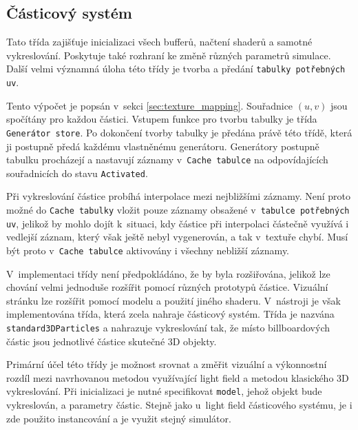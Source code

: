     
\subsection{Částicový systém}
\label{sec:impl_particles}
Tato třída zajišťuje inicializaci všech bufferů, načtení shaderů a samotné vykreslování. Poskytuje také rozhraní ke změně různých parametrů simulace. Další velmi významná úloha této třídy je tvorba a předání \texttt{tabulky potřebných uv}.

Tento výpočet je popsán v~sekci \ref{sec:texture_mapping}. Souřadnice $(u,v)$ jsou spočítány pro každou částici. Vstupem funkce pro tvorbu tabulky je třída \texttt{Generátor store}. Po dokončení tvorby tabulky je předána právě této třídě, která ji postupně předá každému vlastněnému generátoru. Generátory postupně tabulku procházejí a nastavují záznamy v~\texttt{Cache tabulce} na odpovídajících souřadnicích do stavu \texttt{Activated}. 

Při vykreslování částice probíhá interpolace mezi nejbližšími záznamy. Není proto možné do \texttt{Cache tabulky} vložit pouze záznamy obsažené v~\texttt{tabulce potřebných uv}, jelikož by mohlo dojít k~situaci, kdy částice při interpolaci částečně využívá i vedlejší záznam, který však ještě nebyl vygenerován, a tak v~textuře chybí. Musí být proto v~\texttt{Cache tabulce} aktivovány i všechny nebližší záznamy.

V~implementaci třídy není předpokládáno, že by byla rozšiřována, jelikož lze chování velmi jednoduše rozšířit pomocí různých prototypů částice. Vizuální stránku lze rozšířit pomocí modelu a použití jiného shaderu. V~nástroji je však implementována třída, která zcela nahraje částicový systém. Třída je nazvána \texttt{standard3DParticles} a nahrazuje vykreslování tak, že místo billboardových částic jsou jednotlivé částice skutečné 3D objekty. 

Primární účel této třídy je možnost srovnat a změřit vizuální a výkonnostní rozdíl mezi navrhovanou metodou využívající light field a metodou klasického 3D vykreslování. Při inicializaci je nutné specifikovat \texttt{model}, jehož objekt bude vykreslován, a parametry částic. Stejně jako u~light field částicového systému, je i zde použito instancování a je využit stejný simulátor.   
